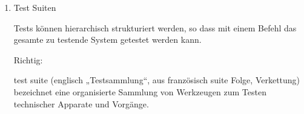 \documentclass{lehramt-informatik-aufgabe}
\begin{document}
\begin{enumerate}
\begin{liAntwort}
Falsch:

Fehler (Error)

Der Software-Test konnte durchgeführt werden, das ermittelte
Ist-Ergebnis und das vorgegebene Soll-Ergebnis weichen jedoch
voneinander ab. Ein derartiger Fehler liegt z. B. dann vor, wenn ein
Funktionsaufruf einen abweichenden Wert berechnet.

Fehlschlag (Failure)

Während der Testdurchführung wurde ein Systemversagen festgestellt. Ein
Fehlschlag liegt z. B. dann vor, wenn das zu testende System einen
Programmabsturz verursacht und hierdurch erst gar kein Ist-Ergebnis
ermittelt werden konnte.\footcite{hoffmann:software}

Das Misslingen kann als Ursache einen Fehler (Error) oder ein falsches
Ergebnis (Failure) haben, die beide per Exception signalisiert werden.
Der Unterschied zwischen den beiden Begriffen liegt darin, dass Failures
erwartet werden, während Errors eher unerwartet auftreten.

\end{liAntwort}


\item Test Suiten

Tests können hierarchisch strukturiert werden, so dass mit einem Befehl
das gesamte zu testende System getestet werden kann.

\begin{liAntwort}
Richtig:

test suite (englisch „Testsammlung“, aus französisch suite Folge,
Verkettung) bezeichnet eine organisierte Sammlung von Werkzeugen zum
Testen technischer Apparate und Vorgänge.
\end{liAntwort}

\end{enumerate}
\end{document}
